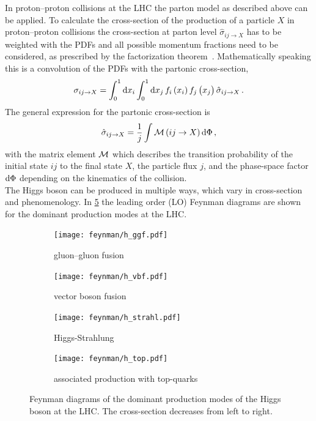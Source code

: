 In proton--proton collisions at the LHC the parton model as described above can be applied.
To calculate the cross-section of the production of a particle $X$ in proton--proton collisions the
cross-section at parton level $\hat{\sigma}_{ij\to X}$ has to be weighted with the PDFs and all
possible momentum fractions need to be considered, as prescribed by the factorization theorem~\cite{DRELL1971578}.
Mathematically speaking this is a convolution of the PDFs with the partonic cross-section,
\begin{equation}
    \sigma_{ij\to X} = \int_{0}^{1} \dif x_i \int_{0}^{1} \dif x_j \,
    f_i \left( x_i \right ) f_j \left( x_j \right ) \hat{\sigma}_{ij\to X} \,.
\end{equation}
The general expression for the partonic cross-section is~\cite{Griffiths}
\begin{equation}
    \hat{\sigma}_{ij\to X} = \frac{1}{j} \int \matrixm \left(ij \to X \right) \dif \Phi \,,
\end{equation}
with the matrix element $\mathcal{M}$ which describes the transition probability of the initial state $ij$ to the final state $X$, the
particle flux $j$, and the phase-space factor $\dif \Phi$ depending on the kinematics of the collision.
\\[\baselineskip]
The Higgs boson can be produced in multiple ways, which vary in cross-section and phenomenology.
In \cref{fig:theory:higgs:production} the leading order (LO) Feynman diagrams are shown for the dominant production modes
at the LHC\@.

\begin{figure}[htb]
    \centering
    \begin{subfigure}[t]{0.302\textwidth}
        \texttt{[image: feynman/h\_ggf.pdf]}
        \caption{gluon--gluon fusion}\label{fig:theory:higgs:ggf}
    \end{subfigure}
    \begin{subfigure}[t]{0.201\textwidth}
        \captionsetup{justification=raggedright}
        \texttt{[image: feynman/h\_vbf.pdf]}
        \caption{vector boson fusion}\label{fig:theory:higgs:vbf}
    \end{subfigure}
    \begin{subfigure}[t]{0.201\textwidth}
        \texttt{[image: feynman/h\_strahl.pdf]}
        \caption{Higgs-Strahlung}\label{fig:theory:higgs:vh}
    \end{subfigure}
    \begin{subfigure}[t]{0.246\textwidth}
        \captionsetup{justification=raggedright}
        \texttt{[image: feynman/h\_top.pdf]}
        \caption{associated \mbox{production} with top-quarks}\label{fig:theory:higgs:tassoc}
    \end{subfigure}
    \caption{Feynman diagrams of the dominant production modes of the Higgs boson at the LHC\@. The cross-section
             decreases from left to right.}\label{fig:theory:higgs:production}
\end{figure}

